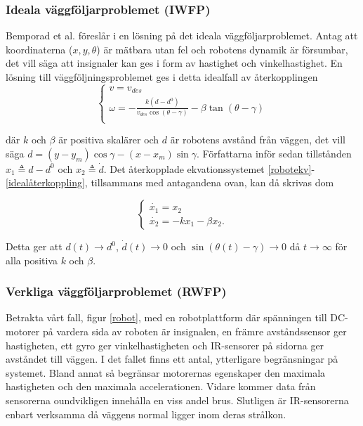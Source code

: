 \documentclass[11pt]{article}
\begin{document}
\begin{flushleft}
\subsubsection{Ideala väggföljarproblemet (IWFP)}
Bemporad et al. föreslår i \cite{wfp} en lösning på det ideala väggföljarproblemet. Antag att  koordinaterna (\(x, y, \theta\)) är mätbara utan fel och robotens dynamik är försumbar, det vill säga att insignaler kan ges i form av hastighet och vinkelhastighet. En lösning till väggföljningsproblemet ges i detta idealfall av återkopplingen
\begin{equation}\label{idealåterkoppling}
	\begin{cases}
	v = v_{des} \\
	\omega = -\frac{k(d - d^0)}{v_{des} \cos (\theta - \gamma)} - \beta \tan (\theta - \gamma) \\
	\end{cases}
\end{equation}

där \(k\) och \(\beta\) är positiva skalärer och \(d\) är robotens avstånd från väggen, det vill säga \(d = (y - y_m)\cos\gamma - (x - x_m)\sin\gamma\). Författarna inför sedan tillstånden \(x_1 \triangleq d - d^0\) och \(x_2 \triangleq \dot{d}\).  Det återkopplade ekvationssystemet \eqref{robotekv}-\eqref{idealåterkoppling}, tillsammans med antagandena ovan, kan då skrivas dom

\begin{equation}
	\begin{cases}
	\dot{x_1} = x_2 \\
	\dot{x_2} = -kx_1 - \beta x_2.
	\end{cases}
\end{equation}

Detta ger att \(d(t) \to d^0\), \(\dot{d}(t) \to 0\) och \(\sin (\theta(t) - \gamma) \to 0\) då $t \to \infty$ för alla positiva $k$ och $\beta$.

\subsubsection{Verkliga väggföljarproblemet (RWFP)}\label{rwfp}
Betrakta vårt fall, figur \ref{robot}, med en robotplattform där spänningen till DC-motorer på vardera sida av roboten är insignalen, en främre avståndssensor ger hastigheten, ett gyro ger vinkelhastigheten och IR-sensorer på sidorna ger avståndet till väggen. I det fallet finns ett antal, ytterligare begränsningar på systemet. Bland annat så begränsar motorernas egenskaper den maximala hastigheten och den maximala accelerationen. Vidare kommer data från sensorerna oundvikligen innehålla en viss andel brus. Slutligen är IR-sensorerna enbart verksamma då  väggens normal ligger inom deras strålkon.


\end{flushleft}
\end{document}
